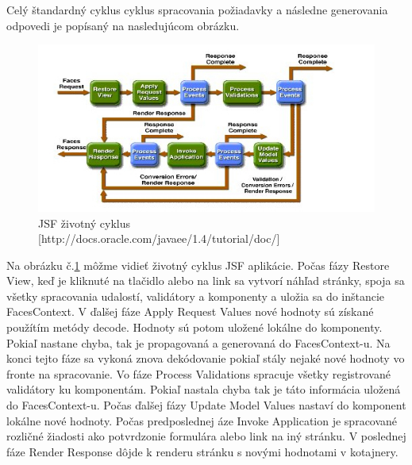 Celý štandardný cyklus cyklus spracovania požiadavky a následne generovania odpovedi je popísaný na nasledujúcom obrázku.
\begin{figure}[htb]

\begin{center}

\includegraphics[scale=0.7]{jsflifecycle.jpg} 
\caption{JSF životný cyklus [http://docs.oracle.com/javaee/1.4/tutorial/doc/] }
\label{lifecycle}

\end{center}

\end{figure}
Na obrázku č.\ref{lifecycle} môžme vidieť životný cyklus JSF aplikácie. Počas fázy Restore View, keď je kliknuté na tlačidlo alebo na link sa vytvorí náhľad stránky, spoja sa všetky spracovania udalostí, validátory a komponenty a uložia sa do inštancie FacesContext. V ďalšej fáze Apply Request Values nové hodnoty sú získané použítím metódy decode. Hodnoty sú potom uložené lokálne do komponenty. Pokiaľ nastane chyba, tak je propagovaná a generovaná do FacesContext-u. Na konci tejto fáze sa vykoná znova dekódovanie pokiaľ stály nejaké nové hodnoty vo fronte na spracovanie. Vo fáze Process Validations spracuje všetky registrované validátory ku komponentám. Pokiaľ nastala chyba tak je táto informácia uložená do FacesContext-u. Počas ďalšej fázy Update Model Values nastaví do komponent lokálne nové hodnoty. Počas predposlednej áze Invoke Application je spracované rozličné žiadosti ako potvrdzonie formulára alebo link na iný stránku. V poslednej fáze Render Response dôjde k renderu stránku s novými hodnotami v kotajnery.

